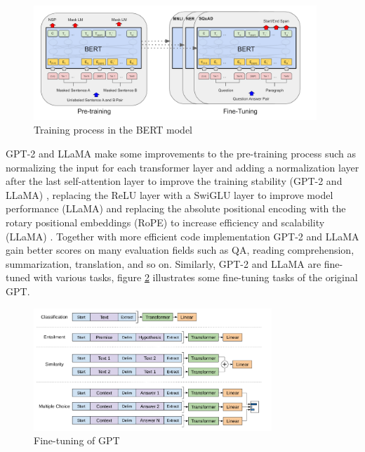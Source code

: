 \documentclass[runningheads]{llncs}
\begin{document}
\begin{figure}[H]
  \centering
  \includegraphics[width=0.95\textwidth]{BERT Finetuning.png}
  \caption{Training process in the BERT model \cite{Devlin18}}
  \label{fig:bert_finetune}
\end{figure}

\noindent \newline
GPT-2 and LLaMA make some improvements to the pre-training process such as normalizing the input for each transformer layer and adding a normalization layer
after the last self-attention layer to improve the training stability (GPT-2 and LLaMA) \cite{Radford19}, replacing the ReLU layer with a SwiGLU layer to improve model performance (LLaMA) and
replacing the absolute positional encoding with the rotary positional embeddings (RoPE) to increase efficiency and scalability (LLaMA) \cite{Touvron23}. Together with more efficient code implementation
GPT-2 and LLaMA gain better scores on many evaluation fields such as QA, reading comprehension, summarization, translation, and so on. Similarly, GPT-2 and LLaMA are fine-tuned with various tasks,
figure \ref{fig:gpt_finetune} illustrates some fine-tuning tasks of the original GPT.



\begin{figure}[H]
    \centering
    \includegraphics[width=0.8\textwidth]{gpt finetune.png}
    \caption{Fine-tuning of GPT \cite{Radford18}}
    \label{fig:gpt_finetune}
\end{figure}
\end{document}
